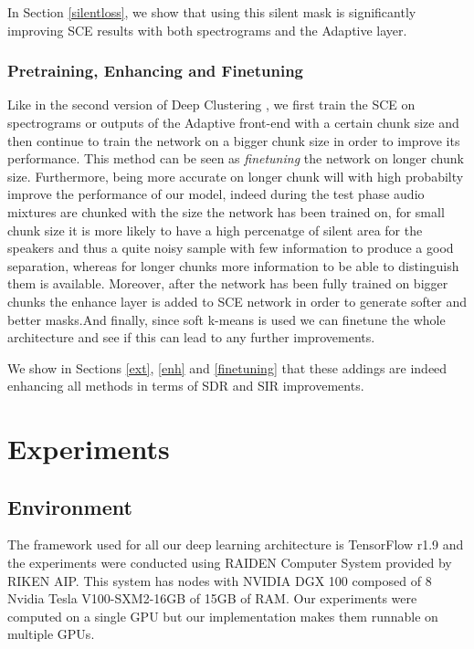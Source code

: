 \documentclass[master, tikz, final,11pt, dvipdfmx]{iscs-thesis}
\begin{document}
In Section \ref{silentloss}, we show that using this silent mask is significantly improving SCE results with both spectrograms and the Adaptive layer.

\subsection{Pretraining, Enhancing and Finetuning}

Like in the second version of Deep Clustering \cite{DPCLV2}, we first train the SCE on spectrograms or outputs of the Adaptive front-end with a certain chunk size and then continue to train the network on a bigger chunk size in order to improve its performance. This method can be seen as \textit{finetuning} the network on longer chunk size. Furthermore, being more accurate on longer chunk will with high probabilty improve the performance of our model, indeed during the test phase audio mixtures are chunked with the size the network has been trained on, for small chunk size it is more likely to have a high percenatge of silent area for the speakers and thus a quite noisy sample with few information to produce a good separation, whereas for longer chunks more information to be able to distinguish them is available.
Moreover, after the network has been fully trained on bigger chunks the enhance layer is added to SCE network in order to generate softer and better masks.And finally, since soft k-means is used we can finetune the whole architecture and see if this can lead to any further improvements.

We show in Sections \ref{ext}, \ref{enh} and \ref{finetuning} that these addings are indeed enhancing all methods in terms of SDR and SIR improvements.


\chapter{Experiments}
\label{exp}

\section{Environment}

The framework used for all our deep learning architecture is TensorFlow r1.9 \cite{TF} and the experiments were conducted using RAIDEN Computer System provided by RIKEN AIP. This system has nodes with NVIDIA DGX 100 composed of 8 Nvidia Tesla V100-SXM2-16GB of 15GB of RAM. Our experiments were computed on a single GPU but our implementation makes them runnable on multiple GPUs. 
\end{document}

